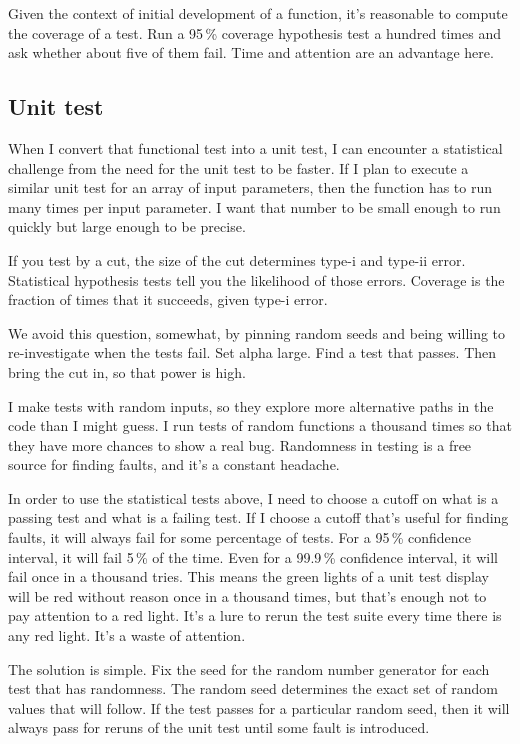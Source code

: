 \documentclass[fleqn,10pt]{olplainarticle}
\begin{document}
Given the context of initial development of a function, it's reasonable
to compute the coverage of a test. Run a 95\,\% coverage hypothesis test a hundred times
and ask whether about five of them fail. Time and attention are
an advantage here.


\subsection{Unit test}
When I convert that functional test into a unit test, I can encounter
a statistical challenge from the need for the unit test to be faster.
If I plan to execute a similar unit test for an array of input parameters,
then the function has to run many times per input parameter. I want that
number to be small enough to run quickly but large enough to be precise.

If you test by a cut, the size of the cut determines type-i and type-ii error.
Statistical hypothesis tests tell you the likelihood of those errors.
Coverage is the fraction of times that it succeeds, given type-i error.

We avoid this question, somewhat, by pinning random seeds and being
willing to re-investigate when the tests fail.
Set alpha large. Find a test that passes. Then bring the cut in,
so that power is high.

I make tests with random inputs, so they explore more alternative
paths in the code than I might guess. I run tests of random
functions a thousand times so that they have more chances to
show a real bug. Randomness in testing is a free source for
finding faults, and it's a constant headache.

In order to use the statistical tests above, I need to choose
a cutoff on what is a passing test and what is a failing test.
If I choose a cutoff that's useful for finding faults, it will
always fail for some percentage of tests. For a 95\,\% confidence
interval, it will fail 5\,\% of the time. Even for a
99.9\,\% confidence interval, it will fail once in a thousand
tries. This means the green lights of a unit test display will
be red without reason once in a thousand times, but that's
enough not to pay attention to a red light. It's a lure to
rerun the test suite every time there is any red light.
It's a waste of attention.

The solution is simple. Fix the seed for the random number
generator for each test that has randomness. The random
seed determines the exact set of random values that will
follow. If the test passes for a particular random seed,
then it will always pass for reruns of the unit test until
some fault is introduced.
\end{document}
